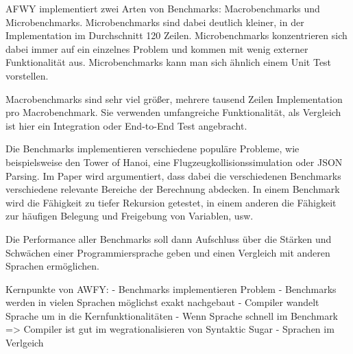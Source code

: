 AFWY implementiert zwei Arten von Benchmarks:
Macrobenchmarks und Microbenchmarks.
Microbenchmarks sind dabei deutlich kleiner, in der Implementation im Durchschnitt 120 Zeilen. Microbenchmarks konzentrieren sich dabei immer auf ein einzelnes Problem und kommen mit wenig externer Funktionalität aus. Microbenchmarks kann man sich ähnlich einem Unit Test vorstellen.

Macrobenchmarks sind sehr viel größer, mehrere tausend Zeilen Implementation pro Macrobenchmark. Sie verwenden umfangreiche Funktionalität, als Vergleich ist hier ein Integration oder End-to-End Test angebracht.

Die Benchmarks implementieren verschiedene populäre Probleme, wie beispielsweise den Tower of Hanoi, eine Flugzeugkollisionssimulation oder JSON Parsing.
Im Paper wird argumentiert, dass dabei die verschiedenen Benchmarks verschiedene relevante Bereiche der Berechnung abdecken.
In einem Benchmark wird die Fähigkeit zu tiefer Rekursion getestet, in einem anderen die Fähigkeit zur häufigen Belegung und Freigebung von Variablen, usw.

Die Performance aller Benchmarks soll dann Aufschluss über die Stärken und Schwächen einer Programmiersprache geben und einen Vergleich mit anderen Sprachen ermöglichen.



Kernpunkte von AWFY:
- Benchmarks implementieren Problem
- Benchmarks werden in vielen Sprachen möglichst exakt nachgebaut
- Compiler wandelt Sprache um in die Kernfunktionalitäten
- Wenn Sprache schnell im Benchmark => Compiler ist gut im wegrationalisieren von Syntaktic Sugar
- Sprachen im Verlgeich






